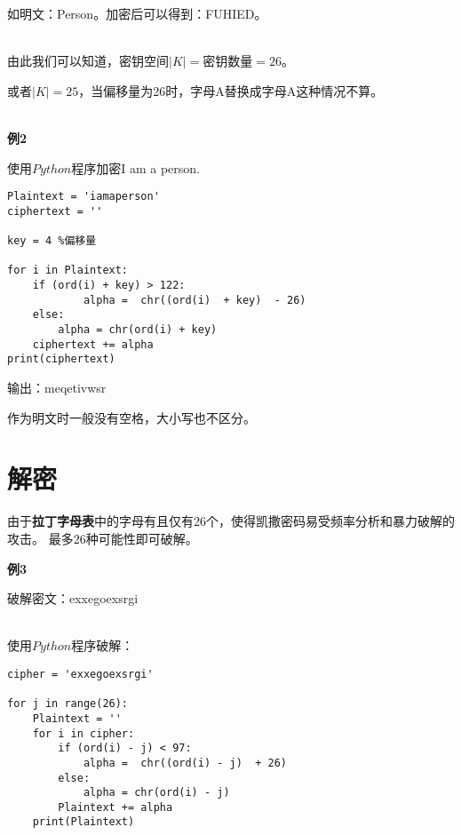 \documentclass{article}
\begin{document}
如明文：Person。加密后可以得到：FUHIED。\qquad\qquad\qquad\qquad\qquad\qquad\qquad\qquad\qquad\qquad\qquad\qquad \Box

~\\

由此我们可以知道，密钥空间$|K| = $密钥数量$ = 26$。

或者$|K| = 25$，当偏移量为26时，字母A替换成字母A这种情况不算。

~\\

\textbf{例2}

使用$Python$程序加密I am a person.

\begin{lstlisting}
Plaintext = 'iamaperson'
ciphertext = ''

key = 4 %偏移量

for i in Plaintext:
    if (ord(i) + key) > 122:
            alpha =  chr((ord(i)  + key)  - 26)
    else:
        alpha = chr(ord(i) + key)
    ciphertext += alpha
print(ciphertext)
\end{lstlisting}

输出：meqetivwsr \qquad\qquad\qquad\qquad\qquad\qquad\qquad\qquad\qquad\qquad\qquad\qquad\qquad\qquad\qquad\qquad \Box

 

作为明文时一般没有空格，大小写也不区分。


\section{解密}
由于\textbf{拉丁字母表}中的字母有且仅有26个，使得凯撒密码易受频率分析和暴力破解的攻击。
最多26种可能性即可破解。

\textbf{例3}

破解密文：exxegoexsrgi

~\\

使用$Python$程序破解：
\begin{lstlisting}
cipher = 'exxegoexsrgi'

for j in range(26):
    Plaintext = ''
    for i in cipher:
        if (ord(i) - j) < 97:
            alpha =  chr((ord(i) - j)  + 26)
        else:
            alpha = chr(ord(i) - j)
        Plaintext += alpha
    print(Plaintext)
\end{lstlisting}
\end{document}
